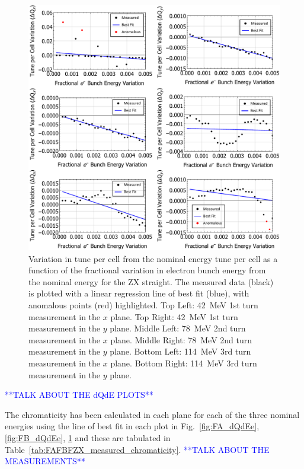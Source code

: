 \documentclass[../main.tex]{subfiles}
\begin{document}
\begin{figure}[!h]
\centering
\includegraphics[width=\textwidth]{Figures/CBETA_Multi-Pass_Commissioning/chromaticity/ZX_analysed_3turn_dQdEe.pdf}
\caption{Variation in tune per cell from the nominal energy tune per cell as a function of the fractional variation in electron bunch energy from the nominal energy for the ZX straight. The measured data (black) is plotted with a linear regression line of best fit (blue), with anomalous points (red) highlighted. Top Left: 42~\si{\mega\electronvolt} 1st turn measurement in the $x$ plane. Top Right: 42~\si{\mega\electronvolt} 1st turn measurement in the $y$ plane. Middle Left: 78~\si{\mega\electronvolt} 2nd turn measurement in the $x$ plane. Middle Right: 78~\si{\mega\electronvolt} 2nd turn measurement in the $y$ plane. Bottom Left: 114~\si{\mega\electronvolt} 3rd turn measurement in the $x$ plane. Bottom Right: 114~\si{\mega\electronvolt} 3rd turn measurement in the $y$ plane.}
\label{fig:ZX_dQdEe}
\end{figure}

\textcolor{blue}{**TALK ABOUT THE dQdE PLOTS**}

The chromaticity has been calculated in each plane for each of the three nominal energies using the line of best fit in each plot in Fig.~\ref{fig:FA_dQdEe}, \ref{fig:FB_dQdEe}, \ref{fig:ZX_dQdEe} and these are tabulated in Table~\ref{tab:FAFBFZX_measured_chromaticity}. \textcolor{blue}{**TALK ABOUT THE MEASUREMENTS**} 
\end{document}
